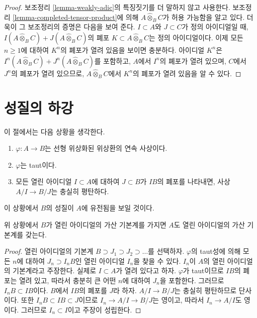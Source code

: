\begin{proof}
보조정리 \ref{lemma-weakly-adic}의 특징짓기를 더 말하지 않고
사용한다. 보조정리 \ref{lemma-completed-tensor-product}에 의해
$A \widehat{\otimes}_B C$가 허용 가능함을 알고 있다. 더욱이 그
보조정리의 증명은 다음을 보여 준다.
$I \subset A$와 $J \subset C$가 정의 아이디얼일 때,
$I(A \widehat{\otimes}_B C) + J(A \widehat{\otimes}_B C)$의 폐포
$K \subset A \widehat{\otimes}_B C$는 정의 아이디얼이다.
이제 모든 $n \geq 1$에 대하여 $K^n$의 폐포가 열려 있음을 보이면
충분하다. 아이디얼 $K^n$은
$I^n(A \widehat{\otimes}_B C) + J^n(A \widehat{\otimes}_B C)$를
포함하고, $A$에서 $I^n$의 폐포가 열려 있으며, $C$에서 $J^n$의
폐포가 열려 있으므로, $A \widehat{\otimes}_B C$에서 $K^n$의
폐포가 열려 있음을 알 수 있다.
\end{proof}






\section{성질의 하강}
\label{section-taut-descent}

\noindent
이 절에서는 다음 상황을 생각한다.
\begin{enumerate}
\item $\varphi : A \to B$는 선형 위상화된 위상환의 연속 사상이다.
\item $\varphi$는 taut이다.
\item 모든 열린 아이디얼 $I \subset A$에 대하여 $J \subset B$가
$IB$의 폐포를 나타내면, 사상 $A/I \to B/J$는 충실히 평탄하다.
\end{enumerate}
이 상황에서 $B$의 성질이 $A$에 유전됨을 보일 것이다.

\begin{lemma}
\label{lemma-taut-descent-countable}
위 상황에서 $B$가 열린 아이디얼의 가산 기본계를 가지면 $A$도
열린 아이디얼의 가산 기본계를 갖는다.
\end{lemma}

\begin{proof}
열린 아이디얼의 기본계
$B \supset J_1 \supset J_2 \supset \ldots$를 선택하자. $\varphi$의
taut성에 의해 모든 $n$에 대하여 $J_n \supset I_nB$인 열린 아이디얼
$I_n$을 찾을 수 있다. $I_n$이 $A$의 열린 아이디얼의 기본계라고
주장한다. 실제로 $I \subset A$가 열려 있다고 하자. $\varphi$가
taut이므로 $IB$의 폐포는 열려 있고, 따라서 충분히 큰 어떤 $n$에
대하여 $J_n$을 포함한다. 그러므로 $I_nB \subset IB$이다. $B$에서
$IB$의 폐포를 $J$라 하자. $A/I \to B/J$는 충실히 평탄하므로
단사이다. 또한 $I_nB \subset IB \subset J$이므로
$I_n \to A/I \to B/J$는 영이고, 따라서 $I_n \to A/I$도 영이다.
그러므로 $I_n \subset I$이고 주장이 성립한다.
\end{proof}

